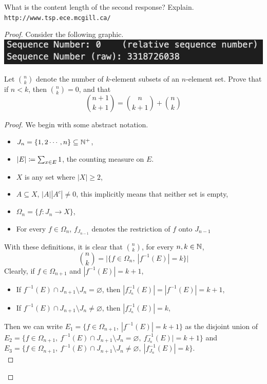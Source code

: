 \documentclass[../../main.tex]{subfiles}
\begin{document}
\begin{wts}
What is the content length of the second response? Explain. \lstinline{http://www.tsp.ece.mcgill.ca/}
\end{wts}
\begin{proof}
Consider the following graphic.\\
\includegraphics[width=\textwidth]{subfiles/images/ECSE_308_Lab_5_1_SUPA_PAGE2_4_Image33.png}
\begin{wts}
    Let $\binom{n}{k}$ denote the number of $k$-element subsets of an $n$-element set. Prove that if $n<k$, then $\binom{n}{k}=0$, and that
    \[
    \binom{n+1}{k+1} = \binom{n}{k+1} + \binom{n}{k}
    \]
\end{wts}
\begin{proof}
    We begin with some abstract notation.
    \begin{itemize}
        \item $J_n = \{1,2\cdots,n\}\subseteq\mathbb{N}^+$,
        \item $|E|\coloneqq\sum_{x\in E}1$, the counting measure on $E$.
        \item $X$ is any set where $|X|\geq 2$,
        \item $A\subseteq X$, $|A||A^c|\neq 0$, this implicitly means that neither set is empty,
        \item $\Omega_n= \{f:J_n\to X\}$,
        \item For every $f\in\Omega_n$, $f_{J_{n-1}}$ denotes the restriction of $f$ onto $J_{n-1}$
    \end{itemize}
    With these definitions, it is clear that $\binom{n}{k}$, for every $n,k\in\mathbb{N}$, 
    \[
    \binom{n}{k}=\biggl|\biggl\{f\in\Omega_n,\: |f^{-1}(E)|=k\biggr\}\biggr|
    \]
    Clearly, if $f\in\Omega_{n+1}$ and $|f^{-1}(E)|=k+1$, \begin{itemize}
        \item If $f^{-1}(E)\cap J_{n+1}\setminus J_{n}=\varnothing$, then $| f_{J_n}^{-1}(E)|=|f^{-1}(E)| =k+1$,
        \item If $f^{-1}(E)\cap J_{n+1}\setminus J_n\neq\varnothing$, then $|f_{J_n}^{-1}(E)|=k$,
    \end{itemize}
    Then we can write $E_1 = \biggl\{f\in\Omega_{n+1},\: |f^{-1}(E)|=k+1\biggr\}$ as the disjoint union of $E_2 = \biggl\{
    f\in\Omega_{n+1},\:
    f^{-1}(E)\cap J_{n+1}\setminus J_{n}=\varnothing,\:
    f_{J_n}^{-1}(E)|=k+1\biggr\}$ and 
    $E_3 = \biggl\{
    f\in\Omega_{n+1},\:f^{-1}(E)\cap J_{n+1}\setminus J_{n}\neq\varnothing,
    \:|f_{J_n}^{-1}(E)|=k\biggr\}$.\\
    

\end{proof}
\end{proof}
\end{document}
